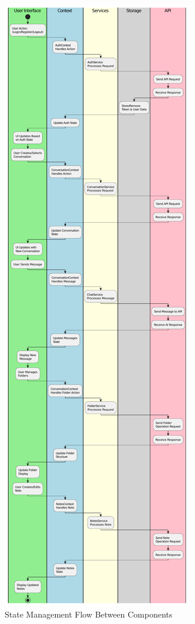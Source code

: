 \begin{figure}[p]
    \centering
    \includegraphics[width=\textwidth,height=\textheight,keepaspectratio]{./Chapter07/figures/state_management_flow.PDF}
    \caption{State Management Flow Between Components}
    \label{fig:state-management-flow}
\end{figure}
\clearpage


